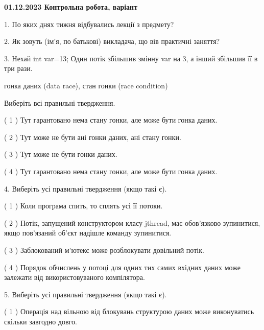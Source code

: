 \documentclass[12pt, ukrainian]{article}
\begin{document}
\vspace{4mm}
\newpage
\begin {large}

\textbf{01.12.2023 Контрольна робота, варіант  }\par


{
1. По яких днях тижня відбувались лекції з предмету?



\vspace{5mm}
2. Як зовуть (ім'я, по батькові) викладача, що вів практичні заняття?



\vspace{5mm}
3. Нехай int var=13; Один потік збільшив змінну var на 3, а інший збільшив її в три рази.

гонка даних (data race), стан гонки (race condition)

Виберіть всі правильні твердження.\par
\vspace{2mm}
( 1 ) Тут гарантовано нема стану гонки, але може бути гонка даних.%

( 2 ) Тут може не бути ані гонки даних, ані стану гонки.%

( 3 ) Тут може не бути гонки даних.%

( 4 ) Тут гарантовано нема стану гонки, але може бути гонка даних.%


\vspace{5mm}
4. Виберіть усі правильні твердження (якщо такі є).\par
\vspace{2mm}

( 1 ) Коли програма спить, то сплять усі її потоки.%

( 2 ) Потік, запущений конструктором класу jthread, має обов’язково зупинитися, якщо пов’язаний об’єкт надішле команду зупинитися.%

( 3 ) Заблокований м’ютекс може розблокувати довільний потік.%

( 4 ) Порядок обчислень у потоці для одних тих самих вхідних даних може залежати від використовуваного компілятора.%


\vspace{5mm}
5. Виберіть усі правильні твердження (якщо такі є).\par
\vspace{2mm}

( 1 ) Операція над вільною від блокувань структурою даних може виконуватись скільки завгодно довго.%

}
\end{large}
\end{document}
